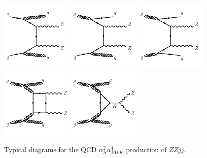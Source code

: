 \begin{figure}[!htbp]
  \begin{center}
  \includegraphics[width=0.31\textwidth]{figures/Theory/diagramQCDZZjjqq.pdf}
  \includegraphics[width=0.31\textwidth]{figures/Theory/diagramQCDZZjjqg.pdf}
  \includegraphics[width=0.31\textwidth]{figures/Theory/diagramQCDZZjjgg.pdf}\\
  \includegraphics[width=0.31\textwidth]{figures/Theory/diagramQCDZZjjbox.pdf}
  \includegraphics[width=0.31\textwidth]{figures/Theory/diagramQCDZZjjggH.pdf}\\
  \end{center}
  \caption{Typical diagrams for the QCD $\alpha_{S}^2\alpha_{EWK}^{4}$ production of $ZZjj$. \label{fig:ZZjjFeynmanDiag_QCD}}
 \end{figure}
 
